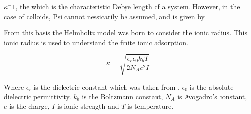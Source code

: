 $\kappa^-1$, the which is the characteristic Debye length of a system. However, in the case of colloids, Psi cannot nessicarily be assumed, and is given by  %

 From this basis the Helmholtz model was born to consider the ionic radius. This ionic radius is used to understand the finite ionic adsorption. %
 
\begin{equation}
\kappa = \sqrt{\frac{\epsilon_r \epsilon_0 k_b T}{2 N_A e^2 I}}
\end{equation}

Where $\epsilon_r$ is the dielectric constant which was taken from \cite{WaterGlycerolEpR}. $\epsilon_0$ is the absolute dielectric permittivity. $k_b$ is the Boltzmann constant, $N_A$ is Avogadro's constant,  $e$ is the charge, $I$ is ionic strength and $T$ is temperature.